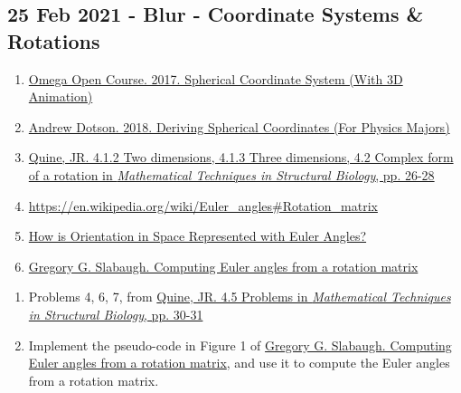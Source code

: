 \documentclass[11pt, oneside]{article}   	%
\begin{document}
\subsection{25 Feb 2021 - Blur - Coordinate Systems \& Rotations}
\begin{enumerate}
	\item \href{https://youtu.be/FDyenWWlPdU}{Omega Open Course. 2017. Spherical Coordinate System (With 3D Animation)}
	\item \href{https://youtu.be/w79nZGzWMyI}{Andrew Dotson. 2018. Deriving Spherical Coordinates (For Physics Majors)}
	\item \href{https://accio.github.io/AMIDD/assets/2020/04/JRQuine-MathBiophysicsBook.pdf}{Quine, JR. 4.1.2 Two dimensions, 4.1.3 Three dimensions, 4.2 Complex form of a rotation in {\it  Mathematical Techniques in Structural Biology},  pp. 26-28}
	\item \url{https://en.wikipedia.org/wiki/Euler_angles#Rotation_matrix}
	\item \href{https://www.mecademic.com/en/how-is-orientation-in-space-represented-with-euler-angles}{How is Orientation in Space Represented with Euler Angles?}
	\item \href{http://www.gregslabaugh.net/publications/euler.pdf}{Gregory G. Slabaugh. Computing Euler angles from a rotation matrix}
\end{enumerate}

\begin{enumerate}
	\item Problems 4, 6, 7, from \href{https://accio.github.io/AMIDD/assets/2020/04/JRQuine-MathBiophysicsBook.pdf}{Quine, JR. 4.5 Problems  in {\it  Mathematical Techniques in Structural Biology},  pp. 30-31}
	\item Implement the pseudo-code in Figure 1 of \href{http://www.gregslabaugh.net/publications/euler.pdf}{Gregory G. Slabaugh. Computing Euler angles from a rotation matrix}, and use it to compute the Euler angles from a rotation matrix.
\end{enumerate}
\end{document}
